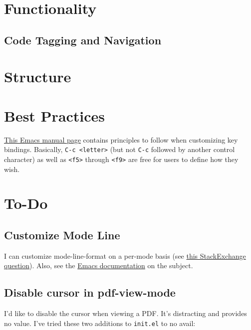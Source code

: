 \documentclass{default}
\begin{document}
\chapter{Functionality}
\label{cha:functionality}

\section{Code Tagging and Navigation}
\label{sec:code-tagging}


\chapter{Structure}\label{cha:structure}


\chapter{Best Practices}
\label{cha:best-practices}

\href{https://www.gnu.org/software/emacs/manual/html_node/elisp/Key-Binding-Conventions.html}{This
  Emacs manual page} contains principles to follow when customizing key bindings. Basically,
\texttt{C-c <letter>} (but not \texttt{C-c} followed by another control
character) as well as \texttt{<f5>} through \texttt{<f9>} are free for users to
define how they wish.


\chapter{To-Do}\label{cha:to-do}

\section{Customize Mode Line}
\label{sec:customize-mode-line}

I can customize mode-line-format on a per-mode basis (see
\href{https://emacs.stackexchange.com/questions/13652/how-to-customize-mode-line-format}{this
  StackExchange question}). Also, see the
\href{https://www.gnu.org/software/emacs/manual/html_node/elisp/Mode-Line-Variables.html#Mode-Line-Variables}{Emacs
  documentation} on the subject.

\section{Disable cursor in pdf-view-mode}

I'd like to disable the cursor when viewing a PDF. It's distracting and provides no value. I've
tried these two additions to \texttt{init.el} to no avail:
\end{document}
